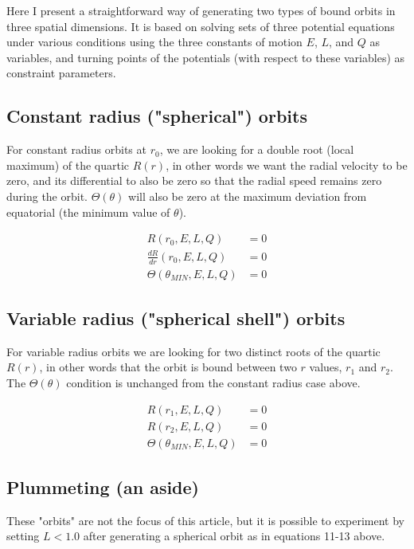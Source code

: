 \documentclass[11pt]{article}
\begin{document}
Here I present a straightforward way of generating two types of bound orbits in three spatial dimensions.  It is based on solving sets of three potential equations under various conditions using the three constants of motion $E$, $L$, and $Q$ as variables, and turning points of the potentials (with respect to these variables) as constraint parameters.

\subsection{Constant radius ("spherical") orbits}

For constant radius orbits at $r_0$, we are looking for a double root (local maximum) of the quartic $R(r)$, in other words we want the radial velocity to be zero, and its differential to also be zero so that the radial speed remains zero during the orbit.  $\Theta (\theta)$ will also be zero at the maximum deviation from equatorial (the minimum value of $\theta$).

\begin{align}
R(r_0, E, L, Q) &= 0 \\
\frac{d R}{d r} (r_0, E, L, Q) &= 0 \\
\Theta(\theta_{MIN}, E, L, Q) &= 0
\end{align}

\subsection{Variable radius ("spherical shell") orbits}

For variable radius orbits we are looking for two distinct roots of the quartic $R(r)$, in other words that the orbit is bound between two $r$ values, $r_1$ and $r_2$.  The $\Theta (\theta)$ condition is unchanged from the constant radius case above.

\begin{align}
R(r_1, E, L, Q) &= 0 \\
R(r_2, E, L, Q) &= 0 \\
\Theta(\theta_{MIN}, E, L, Q) &= 0
\end{align}

\subsection{Plummeting (an aside)}

These "orbits" are not the focus of this article, but it is possible to experiment by setting $L < 1.0$ after generating a spherical orbit as in equations 11-13 above.
\end{document}
